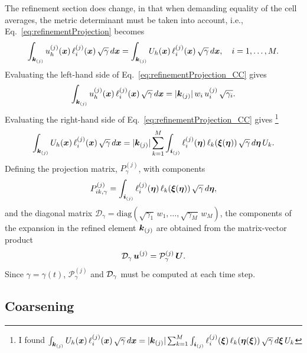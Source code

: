 \documentclass[10pt]{article}
\begin{document}
The refinement
section does change, in that when demanding equality of the cell averages, the metric determinant
must be taken into account, i.e., Eq.~\eqref{eq:refinementProjection} becomes
\begin{equation}
  \int_{\boldsymbol{k}_{(j)}}u_{h}^{(j)}(\boldsymbol{x})\,\ell_{i}^{(j)}(\boldsymbol{x})\,\sqrt{\gamma}\,d\boldsymbol{x}
  =\int_{\boldsymbol{k}_{(j)}}U_{h}(\boldsymbol{x})\,\ell_{i}^{(j)}(\boldsymbol{x})\,\sqrt{\gamma}\,d\boldsymbol{x},\quad i=1,\ldots,M.
  \label{eq:refinementProjection_CC}
\end{equation}
Evaluating the left-hand side of Eq.~\eqref{eq:refinementProjection_CC} gives
\begin{equation}
  \int_{\boldsymbol{k}_{(j)}}u_{h}^{(j)}(\boldsymbol{x})\,\ell_{i}^{(j)}(\boldsymbol{x})\,\sqrt{\gamma}\,d\boldsymbol{x}
  =|\boldsymbol{k}_{(j)}|\,w_{i}\,u_{i}^{(j)}\,\sqrt{\gamma_{i}}.
  \end{equation}
  Evaluating the right-hand side of Eq.~\eqref{eq:refinementProjection_CC} gives
  \footnote{I found  $\int_{\boldsymbol{k}_{(j)}}U_{h}(\boldsymbol{x})\,\ell_{i}^{(j)}(\boldsymbol{x})\,\sqrt{\gamma}\,d\boldsymbol{x}
  =|\boldsymbol{k}_{(j)}|\sum_{k=1}^{M}\int_{\boldsymbol{i}_{(j)}}\ell_{i}^{(j)}(\boldsymbol{\xi})\,\ell_{k}(\boldsymbol{\eta}(\boldsymbol{\xi}))\,\sqrt{\gamma}\,d\boldsymbol{\xi}\,U_{k}$}
  \begin{equation}
  \int_{\boldsymbol{k}_{(j)}}U_{h}(\boldsymbol{x})\,\ell_{i}^{(j)}(\boldsymbol{x})\,\sqrt{\gamma}\,d\boldsymbol{x}
  =|\boldsymbol{k}_{(j)}|\sum_{k=1}^{M}\int_{\boldsymbol{i}_{(j)}}\ell_{i}^{(j)}(\boldsymbol{\eta})\,\ell_{k}(\boldsymbol{\xi}(\boldsymbol{\eta}))\,\sqrt{\gamma}\,d\boldsymbol{\eta}\,U_{k}.
\end{equation}
Defining the projection matrix, $P^{\left(j\right)}_{\gamma}$, with components
\begin{equation}
P^{\left(j\right)}_{ik,\gamma}
=\int_{\boldsymbol{i}_{(j)}}\ell_{i}^{(j)}(\boldsymbol{\eta})\,\ell_{k}(\boldsymbol{\xi}(\boldsymbol{\eta}))\,\sqrt{\gamma}\,d\boldsymbol{\eta},
\end{equation}
and the diagonal matrix $\mathcal{D}_{\gamma}
=\mbox{diag}(\sqrt{\gamma_{1}}\,w_{1},\ldots,\sqrt{\gamma_{M}}\,w_{M})$, the components of the expansion in the refined element $\boldsymbol{k}_{(j)}$ are obtained from the matrix-vector product
\begin{equation}
  \mathcal{D}_{\gamma}\,\boldsymbol{u}^{(j)} = \mathcal{P}^{(j)}_{\gamma}\,\boldsymbol{U}.
\end{equation}
Since $\gamma=\gamma\left(t\right)$, $\mathcal{P}^{\left(j\right)}_{\gamma}$ and $\mathcal{D}_{\gamma}$
must be computed at each time step.

\subsection{Coarsening}
\end{document}
